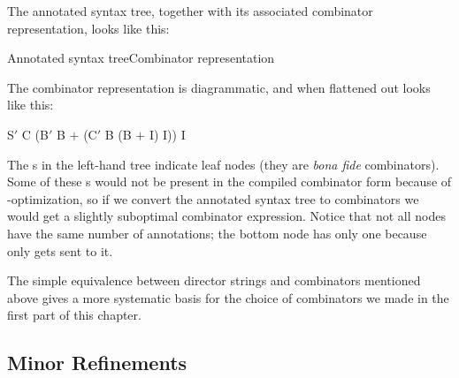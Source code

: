 \noindent
The annotated syntax tree, together with its associated combinator representation, looks like this:

\begin{center}
    \hspace{2cm}%

    \vs
    \hspace{0.5cm}Annotated syntax tree\hspace{2.5cm}Combinator representation
\end{center}

\noindent
The combinator representation is diagrammatic, and when flattened out looks like this:
\begin{mlcoded}
    S$'$ C (B$'$ B $+$ (C$'$ B (B $+$ I) I)) I
\end{mlcoded}
The s in the left-hand tree indicate leaf nodes (they are \textit{bona fide}  combinators). Some of these s would not be present in the compiled combinator form because of \te{}-optimization, so if we convert the annotated syntax tree to combinators we would get a slightly suboptimal combinator expression. Notice that not all nodes have the same number of annotations; the bottom node has only one because only  gets sent to it.

The simple equivalence between director strings and combinators mentioned above gives a more systematic basis for the choice of combinators we made in the first part of this chapter.

\subsection{Minor Refinements}


